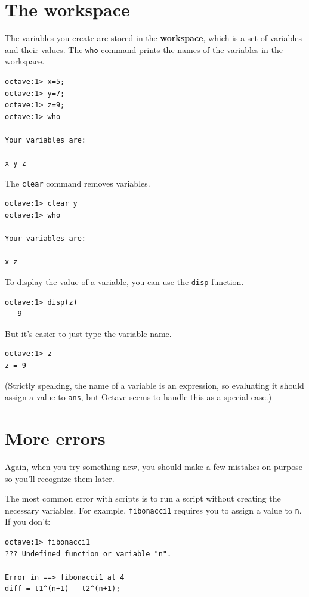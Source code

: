 \documentclass{book}
\begin{document}
\section{The workspace}

The variables you create are stored in the {\bf workspace}, which is a
set of variables and their values. The {\tt who} command prints the
names of the variables in the workspace.

\begin{verbatim}
octave:1> x=5;
octave:1> y=7;
octave:1> z=9;
octave:1> who

Your variables are:

x y z 
\end{verbatim}

The {\tt clear} command removes variables.

\begin{verbatim}
octave:1> clear y
octave:1> who

Your variables are:

x z 
\end{verbatim}

To display the value of a variable, you can use the {\tt disp}
function.

\begin{verbatim}
octave:1> disp(z)
   9
\end{verbatim}

But it's easier to just type the variable name.

\begin{verbatim}
octave:1> z
z = 9
\end{verbatim}

(Strictly speaking, the name of a variable is an expression, so
evaluating it should assign a value to {\tt ans}, but Octave seems
to handle this as a special case.)


\section{More errors}

Again, when you try something new, you should make a few mistakes
on purpose so you'll recognize them later.

The most common error with scripts is to run a script without creating
the necessary variables. For example, {\tt fibonacci1} requires you
to assign a value to {\tt n}. If you don't:

\begin{verbatim}
octave:1> fibonacci1
??? Undefined function or variable "n".

Error in ==> fibonacci1 at 4
diff = t1^(n+1) - t2^(n+1);
\end{verbatim}
 
\end{document}
